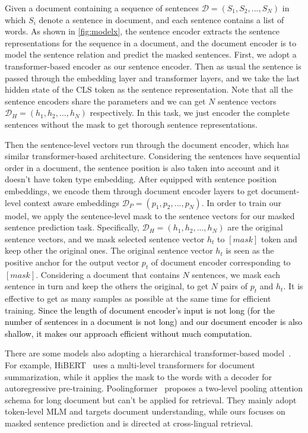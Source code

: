 \documentclass{article} %
\begin{document}
 Given a document containing a sequence of sentences ${\mathcal{D}} = (S_1,S_2,...,S_N)$ in which $S_i$ denote a sentence in document, and each sentence contains a list of words. As shown in \ref{fig:modelx}, the sentence encoder extracts the sentence representations for the sequence in a document, and the document encoder is to model the sentence relation and predict the masked sentences. First, we adopt a transformer-based encoder as our sentence encoder. Then as usual the sentence is passed through the embedding layer and transformer layers, and we take the last hidden state of the CLS token as the sentence representation. Note that all the sentence encoders share the parameters and we can get $N$ sentence vectors $\mathcal{D}_H = (h_1,h_2,...,h_N)$ respectively. In this task, we just encoder the complete sentences without the mask to get thorough sentence representations.

 Then the sentence-level vectors run through the document encoder, which has similar transformer-based architecture. Considering the sentences have sequential order in a document, the sentence position is also taken into account and it doesn't have token type embedding. After equipped with sentence position embeddings, we encode them through document encoder layers to get document-level context aware embeddings $\mathcal{D}_P = (p_1,p_2,...,p_N)$. 
In order to train our model, we apply the sentence-level mask to the sentence vectors for our masked sentence prediction task. Specifically,  $\mathcal{D}_H = (h_1,h_2,...,h_N)$ are the original sentence vectors, and we mask selected sentence vector $h_t$ to $[mask]$ token and keep other the original ones. The original sentence vector $h_t$ is seen as the positive anchor for the output vector $p_t$ of document encoder corresponding to $[mask]$.
Considering a document that contains $N$ sentences, we mask each sentence in turn and keep the others the original, to get $N$ pairs of $p_t$ and $h_t$. It is effective to get as many samples as possible at the same time for efficient training. 
\textcolor{black}{Since the length of document encoder's input is not long (for the number of sentences in a document is not long) and our document encoder is also shallow, it makes our approach efficient without much computation.}


There are some models also adopting a hierarchical transformer-based model~\citep{santra-etal-2021-hierarchical}. For example, HiBERT~\citep{zhang-etal-2019-hibert} uses a multi-level transformers for document summarization, while it applies the mask to the words with a decoder for autoregressive pre-training. Poolingformer~\citep{zhang2021poolingformer} proposes a two-level pooling attention schema for long document but can't be applied for retrieval. They mainly adopt token-level MLM and targets document understanding, while ours focuses on masked sentence prediction and is directed at cross-lingual retrieval.
\end{document}

